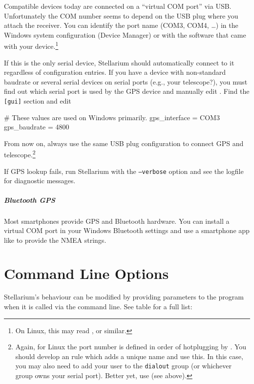 Compatible devices today are connected on a ``virtual COM port'' via
USB. Unfortunately the COM number seems to depend on the USB plug
where you attach the receiver.  You can identify the port name (COM3,
COM4, \ldots) in the Windows system configuration (Device Manager) or
with the software that came with your device.\footnote{On Linux, this
  may read ,  or similar.}

If this is the only serial device, Stellarium should automatically
connect to it regardless of configuration entries.  If you
have a device with non-standard baudrate or several serial devices on
serial ports (e.g., your telescope?), you must find out which serial port is
used by the GPS device and manually edit .  Find
the \texttt{[gui]} section and edit
\begin{configfile}
[gui]
# These values are used on Windows primarily.
gps_interface     = COM3
gps_baudrate      = 4800
\end{configfile}
From now on, always use the same USB plug configuration to connect GPS
and telescope.\footnote{Again, for Linux the port number is defined in
  order of hotplugging by . You should develop an
   rule which adds a unique name and use this. In this
  case, you may also need to add your user to the \texttt{dialout}
  group (or whichever group owns your serial port).  Better yet, use
   (see above).}

If GPS lookup fails, run Stellarium with the \texttt{--verbose} option and
see the logfile for diagnostic messages.

\paragraph{Bluetooth GPS} Most smartphones provide GPS and Bluetooth
hardware. You can install a virtual COM port in your Windows Bluetooth
settings and use a smartphone app like  to provide
the NMEA strings.

\chapter{Command Line Options}
\label{sec:CommandLineOptions}

Stellarium's behaviour can be modified by providing parameters to the
program when it is called via the command line. See table for a full list:

